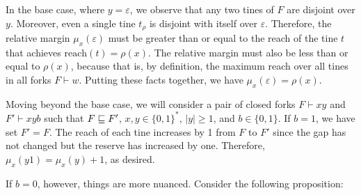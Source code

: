 In the base case, where $y=\varepsilon$, we observe that any two tines of $F$ are disjoint over $y$. Moreover, even a single tine $t_\rho$ is disjoint with itself over $\varepsilon$. Therefore, the relative margin $\mu_x(\varepsilon)$ must be greater than or equal to the reach of the tine $t$ that achieves $\text{reach}(t)=\rho(x)$. The relative margin must also be less than or equal to $\rho(x)$, because that is, by definition, the maximum reach over all tines in all forks $F\vdash w$. Putting these facts together, we have $\mu_x(\varepsilon)=\rho(x)$.

Moving beyond the base case, we will consider a pair of closed forks $F\vdash xy$ and $F'\vdash xyb$ 
such that $F \sqsubseteq F'$, $x,y\in\{0,1\}^*$, $|y| \geq 1$, and $b \in\{0,1\}$. 
If $b=1$, we have set $F' = F$. The reach of each tine increases by 1 from $F$ to $F'$ 
since the gap has not changed but the reserve has increased by one. Therefore, $\mu_x(y1) = \mu_x(y)+1$, as desired.

If $b=0$, however, things are more nuanced. 
Consider the following proposition:





